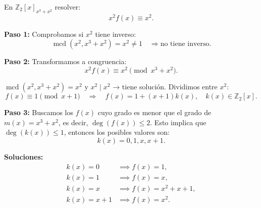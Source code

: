 \documentclass[a4paper,12pt]{article}
\begin{document}
\begin{ejemplo}[title=Ejemplo: Resolución de ecuación de grado 1]
En \(\mathbb{Z}_2[x]_{x^3+x^2}\) resolver:
\[
x^2 f(x) \equiv x^2.
\]

\textbf{Paso 1:} Comprobamos si \(x^2\) tiene inverso:
\[
\operatorname{mcd}(x^2, x^3+x^2) = x^2 \neq 1 \quad \Rightarrow \text{no tiene inverso.}
\]

\textbf{Paso 2:} Transformamos a congruencia:
\[
x^2 f(x) \equiv x^2 \pmod{x^3+x^2}.
\]

\(\operatorname{mcd}(x^2, x^3+x^2) = x^2\) y \(x^2 \mid x^2 \) → tiene solución. Dividimos entre \(x^2\):
\[
f(x) \equiv 1 \pmod{x+1} \quad \Rightarrow \quad f(x) = 1 + (x+1) k(x), \quad k(x) \in \mathbb{Z}_2[x].
\]

\textbf{Paso 3:} Buscamos los \(f(x)\) cuyo grado es menor que el grado de \(m(x) = x^3+x^2\), es decir, \(\deg(f(x)) \le 2\).  
Esto implica que \(\deg(k(x)) \le 1\), entonces los posibles valores son:
\[
k(x) = 0, 1, x, x+1.
\]

\textbf{Soluciones:}
\[
\begin{aligned}
k(x) = 0 &\implies f(x) = 1, \\
k(x) = 1 &\implies f(x) = x, \\
k(x) = x &\implies f(x) = x^2 + x + 1, \\
k(x) = x+1 &\implies f(x) = x^2.
\end{aligned}
\]
\end{ejemplo}
\end{document}
